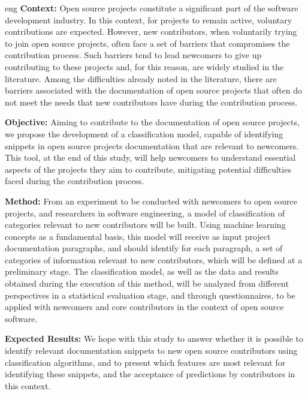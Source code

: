 \begin{resumo}{eng}
\textbf{Context:} Open source projects constitute a significant part of the software development industry. In this context, for projects to remain active, voluntary contributions are expected. However, new contributors, when voluntarily trying to join open source projects, often face a set of barriers that compromises the contribution process. Such barriers tend to lead newcomers to give up contributing to these projects and, for this reason, are widely studied in the literature. Among the difficulties already noted in the literature, there are barriers associated with the documentation of open source projects that often do not meet the needs that new contributors have during the contribution process.

\textbf{Objective:} Aiming to contribute to the documentation of open source projects, we propose the development of a classification model, capable of identifying snippets in open source projects documentation that are relevant to newcomers. This tool, at the end of this study, will help newcomers to understand essential aspects of the projects they aim to contribute, mitigating potential difficulties faced during the contribution process.

\textbf{Method:} From an experiment to be conducted with newcomers to open source projects, and researchers in software engineering, a model of classification of categories relevant to new contributors will be built. Using machine learning concepts as a fundamental basis, this model will receive as input project documentation paragraphs, and should identify for each paragraph, a set of categories of information relevant to new contributors, which will be defined at a preliminary stage. The classification model, as well as the data and results obtained during the execution of this method, will be analyzed from different perspectives in a statistical evaluation stage, and through questionnaires, to be applied with newcomers and core contributors in the context of open source software.

\textbf{Expected Results:} We hope with this study to answer whether it is possible to identify relevant documentation snippets to new open source contributors using classification algorithms, and to present which features are most relevant for identifying these snippets, and the acceptance of predictions by contributors in this context.
\end{resumo}
